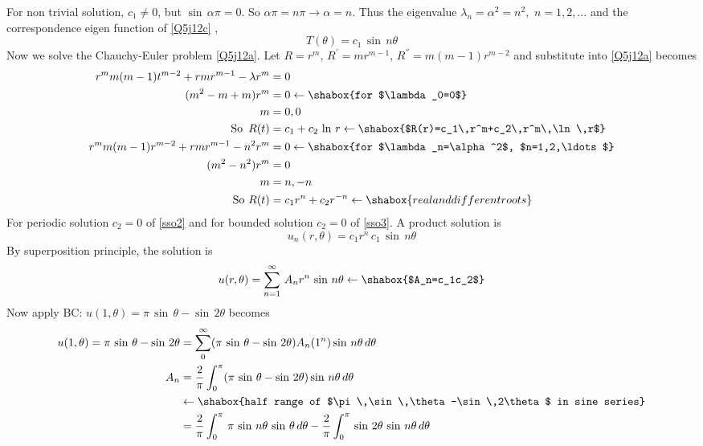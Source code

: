 For non trivial solution, $c_1\neq 0$, but $\sin\,\alpha\pi=0$. So $\alpha\pi=n\pi\to\alpha=n$. Thus the eigenvalue $\lambda_n=\alpha^2=n^2,\,\,n=1,2,\ldots$ and the correspondence eigen function of \eqref{Q5j12c} ,
\begin{equation}
T(\theta)=c_1\,\sin\,n\theta\label{sso1}
\end{equation}
Now we solve the Chauchy-Euler  problem \eqref{Q5j12a}. Let $R=r^m,\,R^{'}=mr^{m-1},\,R^{''}=m(m-1)r^{m-2} $ and substitute into \eqref{Q5j12a} becomes
\begin{align}
r^mm(m-1)t^{m-2}+rmr^{m-1}-\lambda r^m&=0\nonumber\\
(m^2-m+m)r^{m}&=0\leftarrow\shabox{for $\lambda_0=0$}\nonumber\\
m&=0,0\nonumber\\
\text{So}\,\,\,R(t)&=c_1+c_2\,\ln\,r\leftarrow\shabox{$R(r)=c_1\,r^m+c_2\,r^m\,\ln\,r$}\label{sso2}\\ 
r^mm(m-1)r^{m-2}+rmr^{m-1}-n^2r^m&=0\leftarrow\shabox{for $\lambda_n=\alpha^2$, $n=1,2,\ldots$}\nonumber\\
(m^2-n^2)r^m&=0\nonumber\\
m&=n,-n\nonumber\\
\text{So}\,\,R(t)&=c_1r^n+c_2r^{-n}\leftarrow\shabox{real and different roots}\label{sso3}
\end{align}
For periodic solution $c_2=0$ of \eqref{sso2} and for bounded solution $c_2=0$ of \eqref{sso3}. A product solution is 
\begin{equation}
u_n(r,\theta)=c_1r^n\,c_1\,\sin\,n\theta
\end{equation}
By superposition principle, the solution is
\begin{equation}
u(r,\theta)=\sum_{n=1}^\infty\,A_nr^n\,\sin\,n\theta\leftarrow\shabox{$A_n=c_1c_2$}
\end{equation}
Now apply BC: $u(1,\theta)=\pi\,\sin\,\theta-\sin\,2\theta$ becomes
\begin{align*}
u(1,\theta)=\pi\,\sin\,\theta-\sin\,2\theta &=\sum_0^\infty(\pi\,\sin\,\theta-\sin\,2\theta)A_n(1^n)\sin\,n\theta\,d\theta\\
A_n&=\frac{2}{\pi}\int_0^\pi(\pi\,\sin\,\theta-\sin\,2\theta)\sin\,n\theta\,d\theta\\
&\leftarrow\shabox{half range of $\pi\,\sin\,\theta-\sin\,2\theta$ in sine series}\\
&=\frac{2}{\pi}\int_0^\pi\,\pi\,\sin\,n\theta\,\sin\,\theta\,d\theta-\frac{2}{\pi}\int_0^\pi\,\sin\,2\theta\,\sin\,n\theta\,d\theta
\end{align*}

